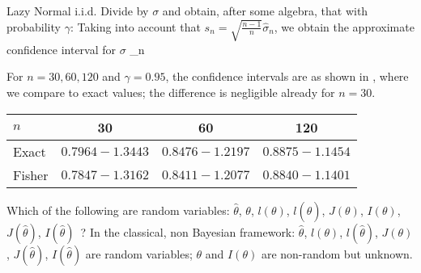 \begin{ex}{Lazy Normal i.i.d.}
Divide by $\sigma$ and obtain, after some algebra, that with
probability $\gamma$:
 \ben
  \leq
  \leq
 \een
Taking into account that $s_n=\sqrt{\frac{n-1}{n}}\hat{\sigma}_n$,
we obtain the approximate confidence interval for $\sigma$
 \be
 \hat{\sigma}_n \;
 \ee

 For $n=30,60,120$ and $\gamma=0.95$, the confidence intervals are
 as shown in , where we compare to exact values;
 the difference is negligible
 already for $n=30$.
\begin{table}
  \centering
  \begin{tabular}{|l||c|c|c|}\hline
    $n$  & 30 & 60 & 120 \\ \hline
    Exact  & $0.7964 -  1.3443$& $0.8476 - 1.2197$& $0.8875 - 1.1454$\\
    Fisher & $0.7847 -  1.3162$& $0.8411 - 1.2077$& $0.8840 - 1.1401$\\
    \hline
  \end{tabular}
\end{table}
\end{ex}
 {Which of the following are random variables: $\hat{\theta}$, $\theta$,
  $l(\theta)$, $l(\hat{\theta})$,  $J(\theta)$, $I(\theta)$, $J(\hat{\theta})$, $I(\hat{\theta})$~?
 }
 {In the classical,
  non Bayesian framework: $\hat{\theta}$, $l(\theta)$, $l(\hat{\theta})$, $J(\theta)$, $J(\hat{\theta})$,
  $I(\hat{\theta})$ are random variables; $\theta$ and $I(\theta)$ are non-random but unknown.
 }



